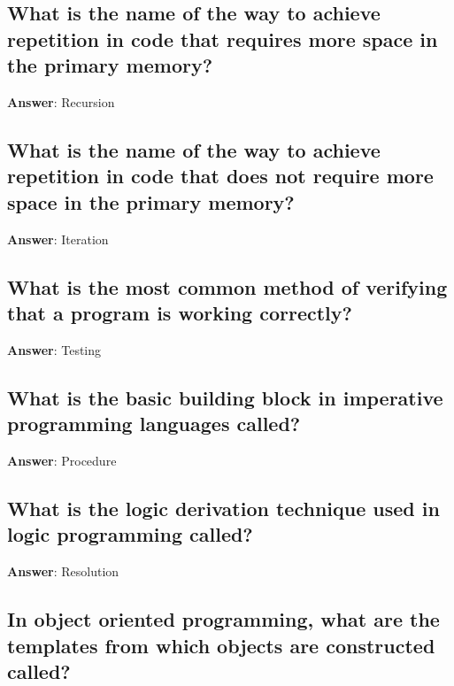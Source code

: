 \documentclass[a4paper,11pt,oneside]{article}
\begin{document}
\begin{sloppypar}
\subsection{What is the name of the way to achieve repetition in code that requires more space in the primary memory?}

\label{q:31:sa:en:True}

\textbf{Answer}: Recursion



\subsection{What is the name of the way to achieve repetition in code that does not require more space in the primary memory?}

\label{q:32:sa:en:True}

\textbf{Answer}: Iteration



\subsection{What is the most common method of verifying that a program is working correctly?}

\label{q:33:sa:en:True}

\textbf{Answer}: Testing



\subsection{What is the basic building block in imperative programming languages called?}

\label{q:34:sa:en:True}

\textbf{Answer}: Procedure



\subsection{What is the logic derivation technique used in logic programming called?}

\label{q:35:sa:en:True}

\textbf{Answer}: Resolution



\subsection{In object oriented programming, what are the templates from which objects are constructed called?}


\end{sloppypar}
\end{document}
